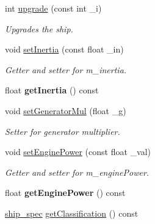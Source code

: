 \begin{DoxyCompactItemize}
\item 
int \hyperlink{classship_a3f99b4cc97a783e997e280667a884d8f}{upgrade} (const int \-\_\-i)
\begin{DoxyCompactList}\small\item\em Upgrades the ship. \end{DoxyCompactList}\item 
\hypertarget{classship_aacfbddf2d0b29db49f62523e9d60af9c}{void \hyperlink{classship_aacfbddf2d0b29db49f62523e9d60af9c}{set\-Inertia} (const float \-\_\-in)}\label{classship_aacfbddf2d0b29db49f62523e9d60af9c}

\begin{DoxyCompactList}\small\item\em Getter and setter for m\-\_\-inertia. \end{DoxyCompactList}\item 
\hypertarget{classship_ad65743d746abadc12bf2c24cf465bfcd}{float {\bfseries get\-Inertia} () const }\label{classship_ad65743d746abadc12bf2c24cf465bfcd}

\item 
\hypertarget{classship_af1a5baf45ce6abd307284d604fc03685}{void \hyperlink{classship_af1a5baf45ce6abd307284d604fc03685}{set\-Generator\-Mul} (float \-\_\-g)}\label{classship_af1a5baf45ce6abd307284d604fc03685}

\begin{DoxyCompactList}\small\item\em Setter for generator multiplier. \end{DoxyCompactList}\item 
\hypertarget{classship_a336b4c1483e8d38bb53e611e6e16e737}{void \hyperlink{classship_a336b4c1483e8d38bb53e611e6e16e737}{set\-Engine\-Power} (const float \-\_\-val)}\label{classship_a336b4c1483e8d38bb53e611e6e16e737}

\begin{DoxyCompactList}\small\item\em Getter and setter for m\-\_\-engine\-Power. \end{DoxyCompactList}\item 
\hypertarget{classship_a472e2517a1285ba9b61d476233aef9c2}{float {\bfseries get\-Engine\-Power} () const }\label{classship_a472e2517a1285ba9b61d476233aef9c2}

\item 
\hypertarget{classship_a68b49f5befb6f882b2900d47d0f8a960}{\hyperlink{ship_8hpp_af74a63841701826d661cb9809aaf7092}{ship\-\_\-spec} \hyperlink{classship_a68b49f5befb6f882b2900d47d0f8a960}{get\-Classification} () const }\label{classship_a68b49f5befb6f882b2900d47d0f8a960}


\end{DoxyCompactItemize}
